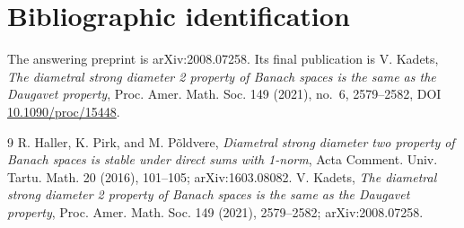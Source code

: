 \documentclass[11pt]{article}
\begin{document}
\section*{Bibliographic identification}
The answering preprint is arXiv:2008.07258.  Its final publication is
V. Kadets, \emph{The diametral strong diameter 2 property of Banach spaces is
the same as the Daugavet property}, Proc. Amer. Math. Soc. 149 (2021), no.~6,
2579--2582, DOI \href{https://doi.org/10.1090/proc/15448}{10.1090/proc/15448}.

\begin{thebibliography}{9}
R. Haller, K. Pirk, and M. P\~oldvere,
\emph{Diametral strong diameter two property of Banach spaces is stable under
direct sums with 1-norm}, Acta Comment. Univ. Tartu. Math. 20 (2016), 101--105;
arXiv:1603.08082.
V. Kadets,
\emph{The diametral strong diameter 2 property of Banach spaces is the same
as the Daugavet property}, Proc. Amer. Math. Soc. 149 (2021), 2579--2582;
arXiv:2008.07258.
\end{thebibliography}
\end{document}

